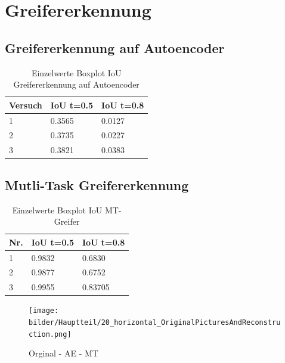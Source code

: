 \chapter{Greifererkennung}
\label{appendix:Greifererkennung}

\section{Greifererkennung auf Autoencoder}
\label{appendix:GreifererkennungAufAutoencoder}

\begin{table}[ht]
	\centering
	\begin{tabularx}{\textwidth}{lll}
		\textbf{Versuch}  & \textbf{IoU t=0.5} & \textbf{IoU t=0.8}  	 \\ \hline 
		1 & 0.3565 & 0.0127 \\
		2 & 0.3735 & 0.0227 \\
		3 & 0.3821 & 0.0383 \\ 
	\end{tabularx}
	\caption{Einzelwerte Boxplot IoU Greifererkennung auf Autoencoder}
	\label{table:EinzelwerteBoxplotIoUGreifererkennungaufAutoencoder}
\end{table}

\section{Mutli-Task Greifererkennung}
\label{appendix:MutliTaskGreifererkennung}

\begin{table}[ht]
	\centering
	\begin{tabularx}{\textwidth}{lll}
		\textbf{Nr.}  & \textbf{IoU t=0.5} & \textbf{IoU t=0.8}  	 \\ \hline 
		1 & 0.9832 & 0.6830 \\
		2 & 0.9877 & 0.6752 \\
		3 & 0.9955 & 0.83705 \\

	\end{tabularx}
	\caption{Einzelwerte Boxplot IoU MT-Greifer}
	\label{table:EinzelwerteBoxplotIoUMTGreifer}
\end{table}



\begin{figure}[h]
	\centering
	\texttt{[image: bilder/Hauptteil/20\_horizontal\_OriginalPicturesAndReconstruction.png]}
	\caption{Orginal -  AE - MT}
	\label{img:AppendixReconstruction}	
\end{figure}


